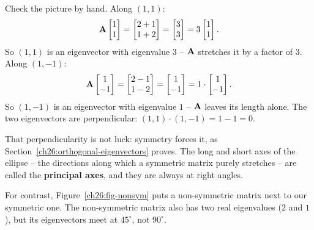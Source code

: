 Check the picture by hand. Along $(1,1)$:
\[
  \mathbf{A}\begin{bmatrix}1\\1\end{bmatrix} = \begin{bmatrix}2+1\\1+2\end{bmatrix} = \begin{bmatrix}3\\3\end{bmatrix} = 3\begin{bmatrix}1\\1\end{bmatrix}.
\]
So $(1,1)$ is an eigenvector with eigenvalue $3$ -- $\mathbf{A}$ stretches it by a
factor of $3$. Along $(1,-1)$:
\[
  \mathbf{A}\begin{bmatrix}1\\-1\end{bmatrix} = \begin{bmatrix}2-1\\1-2\end{bmatrix} = \begin{bmatrix}1\\-1\end{bmatrix} = 1\cdot\begin{bmatrix}1\\-1\end{bmatrix}.
\]
So $(1,-1)$ is an eigenvector with eigenvalue $1$ -- $\mathbf{A}$ leaves its length
alone. The two eigenvectors are perpendicular: $(1,1)\cdot(1,-1) = 1-1 = 0$.

That perpendicularity is not luck: symmetry forces it, as
Section~\ref{ch26:orthogonal-eigenvectors} proves. The long and short axes of the
ellipse -- the directions along which a symmetric matrix purely stretches -- are
called the \textbf{principal axes}, and they are always at right angles.

For contrast, Figure~\ref{ch26:fig-nonsym} puts a non-symmetric matrix next to
our symmetric one. The non-symmetric matrix also has two real eigenvalues ($2$
and $1$), but its eigenvectors meet at $45^\circ$, not $90^\circ$.

